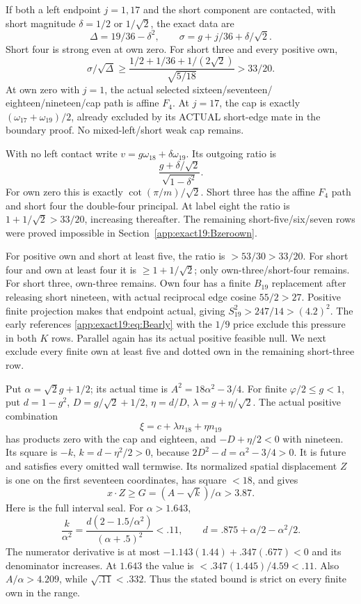\documentclass[11pt]{article}
\theoremstyle{definition}
\theoremstyle{remark}
\begin{document}
If both a left endpoint \(j=1,17\)
and the short component are
contacted, with short magnitude
\(\delta=1/2\) or \(1/\sqrt2\),
the exact data are
\[
             \Delta=19/36-\delta^2,\qquad
             \sigma=g+j/36+\delta/\sqrt2 .
\]
Short four is strong even at
own zero.
For short three and every
positive own,
\[
 \sigma/\sqrt\Delta\ge
 \frac{1/2+1/36+1/(2\sqrt2)}{\sqrt{5/18}}>33/20 .
\]
At own zero with \(j=1\), the
actual selected sixteen/seventeen/
eighteen/nineteen/cap path is
affine \(F_4\).
At \(j=17\), the cap is exactly
\((\omega_{17}+\omega_{19})/2\),
already excluded by its ACTUAL
short-edge mate in the boundary
proof.
No mixed-left/short weak cap
remains.

With no left contact write
\(v=g\omega_{18}+\delta\omega_{19}\).
Its outgoing ratio is
\[
                         \frac{g+\delta/\sqrt2}{\sqrt{1-\delta^2}} .
\]
For own zero this is exactly
\(\cot(\pi/m)/\sqrt2\).
Short three has the affine \(F_4\)
path and short four the double-four
principal.
At label eight the ratio is
\(1+1/\sqrt2>33/20\), increasing
thereafter.
The remaining short-five/six/seven
rows were proved impossible in
Section~\ref{app:exact19:Bzeroown}.

For positive own and short at
least five, the ratio is
\(>53/30>33/20\).
For short four and own at least
four it is \(\ge1+1/\sqrt2\);
only own-three/short-four remains.
For short three, own-three remains.
Own four has a finite \(B_{19}\)
replacement after releasing short
nineteen, with actual reciprocal
edge cosine \(55/2>27\).
Positive finite projection makes
that endpoint actual, giving
\(S_{19}^2>247/14>(4.2)^2\).
The early references
\eqref{app:exact19:eq:Bearly}
with the \(1/9\) price exclude
this pressure in both \(K\) rows.
Parallel again has its actual
positive feasible null.
We next exclude every finite
own at least five and dotted
own in the remaining short-three
row.

Put \(\alpha=\sqrt2g+1/2\);
its actual time is
\(A^2=18\alpha^2-3/4\).
For finite \(\varphi/2\le g<1\),
put \(d=1-g^2\), \(D=g/\sqrt2+1/2\),
\(\eta=d/D\), \(\lambda=g+\eta/\sqrt2\).
The actual positive combination
\[
                             \xi=c+\lambda n_{18}+\eta n_{19}
\]
has products zero with the cap
and eighteen, and
\(-D+\eta/2<0\) with nineteen.
Its square is \(-k\),
\(k=d-\eta^2/2>0\), because
\(2D^2-d=\alpha^2-3/4>0\).
It is future and satisfies every
omitted wall termwise.
Its normalized spatial displacement
\(Z\) is one on the first seventeen
coordinates, has square \(<18\),
and gives
\[
                 x\cdot Z\ge G=(A-\sqrt k)/\alpha>3.87 .
\]
Here is the full interval seal.
For \(\alpha>1.643\),
\[
 \frac{k}{\alpha^2}
   =\frac{d(2-1.5/\alpha^2)}{(\alpha+.5)^2}<.11,
 \qquad d=.875+\alpha/2-\alpha^2/2 .
\]
The numerator derivative is at
most \(-1.143(1.44)+.347(.677)<0\)
and its denominator increases.
At \(1.643\) the value is
\(<.347(1.445)/4.59<.11\).
Also \(A/\alpha>4.209\), while
\(\sqrt{.11}<.332\).
Thus the stated bound is strict
on every finite own in the range.
\end{document}
